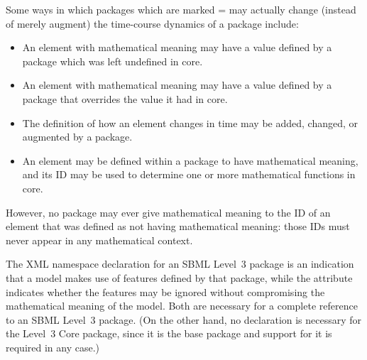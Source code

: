\begin{enumerate}
\begin{blockChanged}
Some ways in which packages which are marked  =  may actually change (instead of merely augment) the time-course dynamics of a package include:
\begin{itemize}
  \item An element with mathematical meaning may have a value defined by a package which was left undefined in core.
  \item An element with mathematical meaning may have a value defined by a package that overrides the value it had in core.
  \item The definition of how an element changes in time may be added, changed, or augmented by a package.
  \item An element may be defined within a package to have mathematical meaning, and its ID may be used to determine one or more mathematical functions in core.
\end{itemize}
However, no package may ever give mathematical meaning to the ID of an element that was defined as not having mathematical meaning: those IDs must never appear in any mathematical context.
\end{blockChanged}

\end{enumerate}

The XML namespace declaration for an SBML Level~3 package is an
indication that a model makes use of features defined by that
package, while the  attribute indicates whether
the features may be ignored without compromising the mathematical
meaning of the model.  Both are necessary for a complete reference
to an SBML Level~3 package.  (On the other hand, no declaration is
necessary for the Level~3 Core package, since it is the base
package and support for it is required in any case.)



%
%
%
%
%
%


